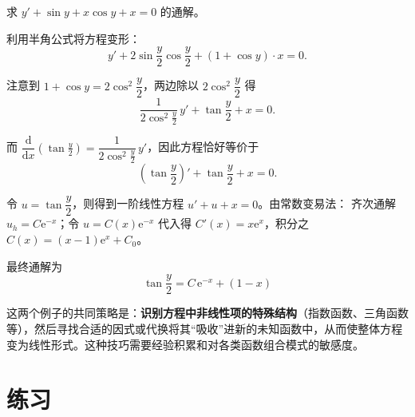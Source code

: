 \documentclass[lang=cn,11pt]{elegantbook}
\begin{document}
\begin{exercise}
求 $y'+\sin y+x\cos y+x=0$ 的通解。
\end{exercise}
\begin{solution}
利用半角公式将方程变形：
\[
y'+2\sin\frac{y}{2}\cos\frac{y}{2}+(1+\cos y)\cdot x=0.
\]

注意到 $1+\cos y=2\cos^{2}\dfrac{y}{2}$，两边除以 $2\cos^{2}\dfrac{y}{2}$ 得
\[
\frac{1}{2\cos^{2}\frac{y}{2}}\,y'+\tan\frac{y}{2}+x=0.
\]

而 $\dfrac{\mathrm{d}}{\mathrm{d}x}\!\left(\tan\frac{y}{2}\right)=\dfrac{1}{2\cos^{2}\frac{y}{2}}\,y'$，因此方程恰好等价于
\[
\left(\tan\frac{y}{2}\right)'+\tan\frac{y}{2}+x=0.
\]

令 $u=\tan\dfrac{y}{2}$，则得到一阶线性方程 $u'+u+x=0$。由常数变易法：
齐次通解 $u_h=C\mathrm{e}^{-x}$；令 $u=C(x)\mathrm{e}^{-x}$ 代入得 $C'(x)=x\mathrm{e}^{x}$，积分之 $C(x)=(x-1)\mathrm{e}^{x}+C_0$。

最终通解为
\[
\boxed{\tan\frac{y}{2}=C\,\mathrm{e}^{-x}+(1-x)}
\]
\end{solution}

\begin{remark}
这两个例子的共同策略是：\textbf{识别方程中非线性项的特殊结构}（指数函数、三角函数等），然后寻找合适的因式或代换将其“吸收”进新的未知函数中，从而使整体方程变为线性形式。这种技巧需要经验积累和对各类函数组合模式的敏感度。
\end{remark}

\section{练习}
\end{document}
